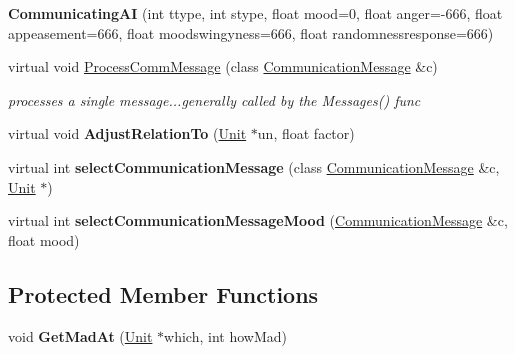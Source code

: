 \begin{DoxyCompactItemize}
\item 
{\bfseries Communicating\+AI} (int ttype, int stype, float mood=0, float anger=-\/666, float appeasement=666, float moodswingyness=666, float randomnessresponse=666)\hypertarget{classCommunicatingAI_a0e98b1ccd2433716520a59104a61028b}{}\label{classCommunicatingAI_a0e98b1ccd2433716520a59104a61028b}

\item 
virtual void \hyperlink{classCommunicatingAI_a468baea9cc0679615b7f5976de5b5bce}{Process\+Comm\+Message} (class \hyperlink{classCommunicationMessage}{Communication\+Message} \&c)\hypertarget{classCommunicatingAI_a468baea9cc0679615b7f5976de5b5bce}{}\label{classCommunicatingAI_a468baea9cc0679615b7f5976de5b5bce}

\begin{DoxyCompactList}\small\item\em processes a single message...generally called by the Messages() func \end{DoxyCompactList}\item 
virtual void {\bfseries Adjust\+Relation\+To} (\hyperlink{classUnit}{Unit} $\ast$un, float factor)\hypertarget{classCommunicatingAI_af445b7b8c394dc19edba816515e4dff0}{}\label{classCommunicatingAI_af445b7b8c394dc19edba816515e4dff0}

\item 
virtual int {\bfseries select\+Communication\+Message} (class \hyperlink{classCommunicationMessage}{Communication\+Message} \&c, \hyperlink{classUnit}{Unit} $\ast$)\hypertarget{classCommunicatingAI_acd733e5670f879773eea1f6dc38010fc}{}\label{classCommunicatingAI_acd733e5670f879773eea1f6dc38010fc}

\item 
virtual int {\bfseries select\+Communication\+Message\+Mood} (\hyperlink{classCommunicationMessage}{Communication\+Message} \&c, float mood)\hypertarget{classCommunicatingAI_a2d49aa5fb086c7e333241054463224a3}{}\label{classCommunicatingAI_a2d49aa5fb086c7e333241054463224a3}

\end{DoxyCompactItemize}
\subsection*{Protected Member Functions}
\begin{DoxyCompactItemize}
\item 
void {\bfseries Get\+Mad\+At} (\hyperlink{classUnit}{Unit} $\ast$which, int how\+Mad)\hypertarget{classCommunicatingAI_ab806cccfbc16af054c63a675d7830bad}{}\label{classCommunicatingAI_ab806cccfbc16af054c63a675d7830bad}

\end{DoxyCompactItemize}
